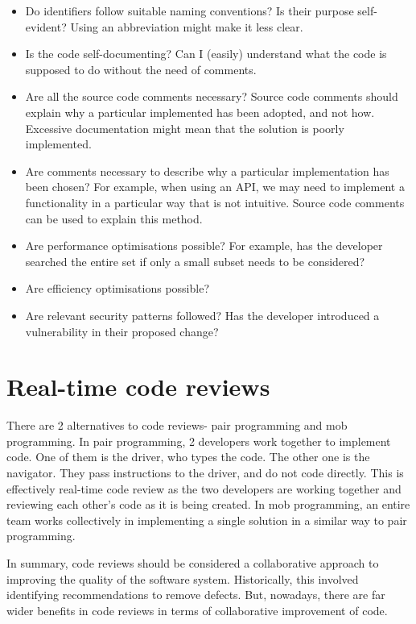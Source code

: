 \documentclass[a4paper, openany]{memoir}
\begin{document}
\begin{itemize}
    \item Do identifiers follow suitable naming conventions? Is their purpose self-evident? Using an abbreviation might make it less clear.
    \item Is the code self-documenting? Can I (easily) understand what the code is supposed to do without the need of comments.
    \item Are all the source code comments necessary? Source code comments should explain why a particular implemented has been adopted, and not how. Excessive documentation might mean that the solution is poorly implemented.
    \item Are comments necessary to describe why a particular implementation has been chosen? For example, when using an API, we may need to implement a functionality in a particular way that is not intuitive. Source code comments can be used to explain this method.
    \item Are performance optimisations possible? For example, has the developer searched the entire set if only a small subset needs to be considered?
    \item Are efficiency optimisations possible?
    \item Are relevant security patterns followed? Has the developer introduced a vulnerability in their proposed change?
\end{itemize}

\section{Real-time code reviews}
There are 2 alternatives to code reviews- pair programming and mob programming. In pair programming, 2 developers work together to implement code. One of them is the driver, who types the code. The other one is the navigator. They pass instructions to the driver, and do not code directly. This is effectively real-time code review as the two developers are working together and reviewing each other's code as it is being created. In mob programming, an entire team works collectively in implementing a single solution in a similar way to pair programming.

In summary, code reviews should be considered a collaborative approach to improving the quality of the software system. Historically, this involved identifying recommendations to remove defects. But, nowadays, there are far wider benefits in code reviews in terms of collaborative improvement of code.
\end{document}
